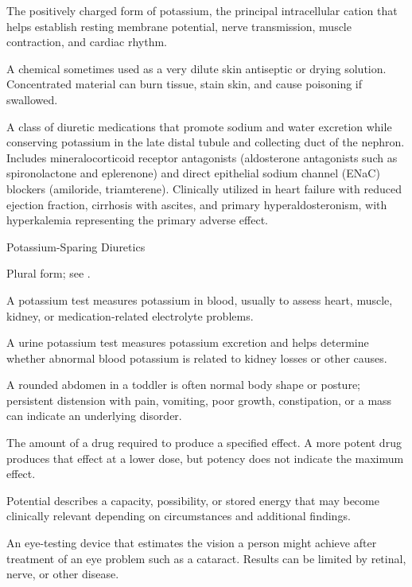  The positively charged form of potassium, the principal intracellular cation that helps establish resting membrane potential, nerve transmission, muscle contraction, and cardiac rhythm.

 A chemical sometimes used as a very dilute skin antiseptic or drying solution. Concentrated material can burn tissue, stain skin, and cause poisoning if swallowed.

 A class of diuretic medications that promote sodium and water excretion while conserving potassium in the late distal tubule and collecting duct of the nephron. Includes mineralocorticoid receptor antagonists (aldosterone antagonists such as spironolactone and eplerenone) and direct epithelial sodium channel (ENaC) blockers (amiloride, triamterene). Clinically utilized in heart failure with reduced ejection fraction, cirrhosis with ascites, and primary hyperaldosteronism, with hyperkalemia representing the primary adverse effect.

\synonyms
Potassium-Sparing Diuretics

 Plural form; see .

 A potassium test measures potassium in blood, usually to assess heart, muscle, kidney, or medication-related electrolyte problems.

 A urine potassium test measures potassium excretion and helps determine whether abnormal blood potassium is related to kidney losses or other causes.

 A rounded abdomen in a toddler is often normal body shape or posture; persistent distension with pain, vomiting, poor growth, constipation, or a mass can indicate an underlying disorder.

 The amount of a drug required to produce a specified effect. A more potent drug produces that effect at a
lower dose, but potency does not indicate the maximum effect.

 Potential describes a capacity, possibility, or stored energy that may become clinically relevant depending on circumstances and additional findings.

 An eye-testing device that estimates the vision a person might achieve after treatment of an eye problem such as a cataract. Results can be limited by retinal, nerve, or other disease.


